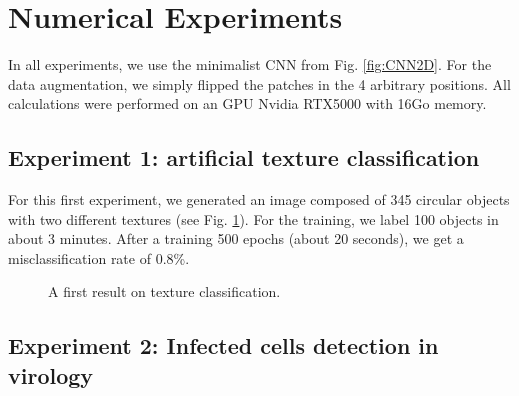\documentclass{article}
\begin{document}
\section{Numerical Experiments}
\label{sec:experiments}

In all experiments, we use the minimalist CNN from Fig. \ref{fig:CNN2D}. 
For the data augmentation, we simply flipped the patches in the 4 arbitrary positions.
All calculations were performed on an GPU Nvidia RTX5000 with 16Go memory.

\subsection{Experiment 1: artificial texture classification}

For this first experiment, we generated an image composed of  345 circular objects with two different textures (see Fig. \ref{fig:textures}). 
For the training, we label 100 objects in about 3 minutes. 
After a training 500 epochs (about 20 seconds), we get a misclassification rate of 0.8\%.

\begin{figure}[h!]
  \begin{center}
     \quad 
     \end{center}
\caption{A first result on texture classification. \label{fig:textures}}
\end{figure}


\subsection{Experiment 2: Infected cells detection in virology}
\end{document}
